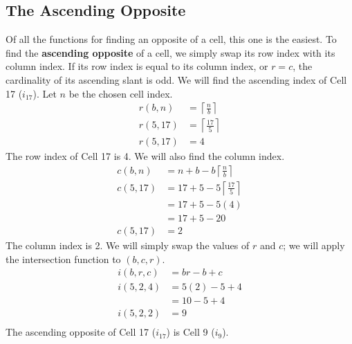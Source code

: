 \documentclass[letterpaper, twoside,12pt]{article}
\begin{document}
    \subsection{The Ascending Opposite}
    Of all the functions for finding an opposite of a cell, this one is the easiest. To find the \textbf{ascending opposite} of a cell, we simply swap its row index with its column index. If its row index is equal to its column index, or $r=c$, the cardinality of its ascending slant is odd. We will find the ascending index of Cell 17 ($i_{17}$). Let $n$ be the chosen cell index.
    \begin{equation}
        \begin{split}
            r(b,n) &= \left\lceil \frac{n}{b}\right\rceil \\
            r(5,17) &= \left\lceil \frac{17}{5}\right\rceil \\
            r(5,17) &= 4
        \end{split}
    \end{equation}
    The row index of Cell 17 is 4. We will also find the column index.
    \begin{equation}
        \begin{split}
            c(b,n) &= n + b - b\left\lceil \frac{n}{b}\right\rceil \\
            c(5,17) &= 17 + 5 - 5\left\lceil \frac{17}{5}\right\rceil \\
                &= 17 + 5 - 5(4) \\
                &= 17 + 5 - 20 \\
            c(5,17) &= 2
        \end{split}
    \end{equation}
    The column index is 2. We will simply swap the values of $r$ and $c$; we will apply the intersection function to $(b,c,r)$.
    \begin{equation}
        \begin{split}
            i(b,r,c) &= br - b + c \\
            i(5,2,4) &= 5(2) - 5 + 4 \\
                &= 10 - 5 + 4 \\
            i(5,2,2) &= 9 \\
        \end{split}
    \end{equation}
    The ascending opposite of Cell 17 ($i_{17}$) is Cell 9 ($i_{9}$).
\end{document}
